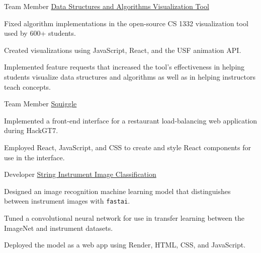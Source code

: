 \begin{cventries}

\cvproject
{Team Member} %
{
    \href{https://github.com/RodrigoDLPontes/visualization-tool}
    {Data Structures and Algorithms Visualization Tool}
} %
{} %
{} %
{ %
\begin{cvitems}
\item Fixed algorithm implementations in the open-source CS 1332 visualization tool used by 600+ students.
\item Created visualizations using JavaScript, React, and the USF animation API.
\item Implemented feature requests that increased the tool's effectiveness
in helping students visualize data structures and algorithms
as well as in helping instructors teach concepts.
\end{cvitems}
}

\cvproject
{Team Member} %
{
    \href{https://github.com/BadGuy-1863/HackGT7}
    {Squiggle}
} %
{} %
{} %
{ %
\begin{cvitems}
    \item Implemented a front-end interface for a restaurant load-balancing web application
    during HackGT7.
    \item Employed React, JavaScript, and CSS to 
    create and style React components for use in the interface.
\end{cvitems}
}

\cvproject
{Developer} %
{
    \href{https://github.com/hzhu359/fastai-v3}
    {String Instrument Image Classification}
} %
{} %
{} %
{ %
\begin{cvitems}
\item Designed an image recognition machine learning model that distinguishes between instrument images with \texttt{fastai}. 
\item Tuned a convolutional neural network for use in transfer learning between the ImageNet and instrument datasets.
\item Deployed the model as a web app using Render, HTML, CSS, and JavaScript.
\end{cvitems}
}



\end{cventries}
